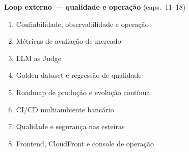 \noindent\textbf{Loop externo --- qualidade e opera\c{c}\~ao} (caps.\ 11--18)
\begin{enumerate}[leftmargin=*, start=11]
  \item Confiabilidade, observabilidade e opera\c{c}\~ao
  \item M\'etricas de avalia\c{c}\~ao de mercado
  \item LLM as Judge
  \item Golden dataset e regress\~ao de qualidade
  \item Roadmap de produ\c{c}\~ao e evolu\c{c}\~ao cont\'inua
  \item CI/CD multiambiente banc\'ario
  \item Qualidade e seguran\c{c}a nas esteiras
  \item Frontend, CloudFront e console de opera\c{c}\~ao
\end{enumerate}
